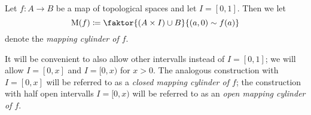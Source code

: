 \begin{definition}
    Let $f\colon A\to B$ be a map of topological spaces and let $I=[0,1]$.
    Then we let
    \begin{equation*}
        \M(f)\coloneqq\faktor{\left(A\times I\right)\cup B}{(a,0)\sim f(a)}
    \end{equation*}
    denote the \emph{mapping cylinder of $f$}.

    It will be convenient to also allow other intervalls instead of $I=[0,1]$; we will allow $I=[0,x]$ and $I=[0,x)$ for $x>0$.
    The analogous construction with $I=[0,x]$ will be referred to as a \emph{closed mapping cylinder of $f$};
    the construction with half open intervalls $I=[0,x)$ will be referred to as an \emph{open mapping cylinder of $f$}. %
\end{definition}
